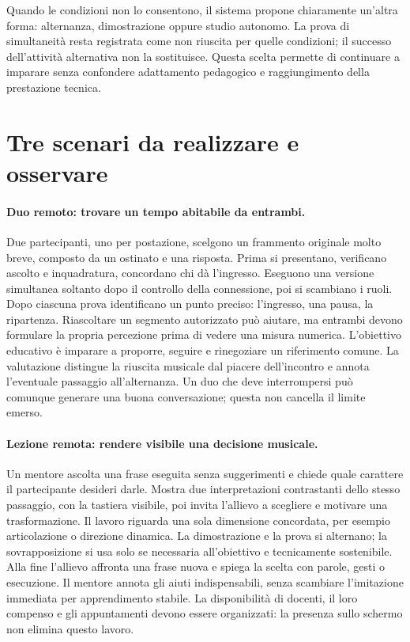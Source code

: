 Quando le condizioni non lo consentono, il sistema propone chiaramente
un'altra forma: alternanza, dimostrazione oppure studio autonomo. La prova
di simultaneità resta registrata come non riuscita per quelle condizioni;
il successo dell'attività alternativa non la sostituisce. Questa scelta
permette di continuare a imparare senza confondere adattamento pedagogico
e raggiungimento della prestazione tecnica.

\section{Tre scenari da realizzare e osservare}

\paragraph{Duo remoto: trovare un tempo abitabile da entrambi.}
Due partecipanti, uno per postazione, scelgono un frammento originale
molto breve, composto da un ostinato e una risposta. Prima si presentano,
verificano ascolto e inquadratura, concordano chi dà l'ingresso. Eseguono
una versione simultanea soltanto dopo il controllo della connessione,
poi si scambiano i ruoli. Dopo ciascuna prova identificano un punto preciso:
l'ingresso, una pausa, la ripartenza. Riascoltare un segmento autorizzato
può aiutare, ma entrambi devono formulare la propria percezione prima
di vedere una misura numerica. L'obiettivo educativo è imparare a proporre,
seguire e rinegoziare un riferimento comune. La valutazione distingue
la riuscita musicale dal piacere dell'incontro e annota l'eventuale passaggio
all'alternanza. Un duo che deve interrompersi può comunque generare una
buona conversazione; questa non cancella il limite emerso.

\paragraph{Lezione remota: rendere visibile una decisione musicale.}
Un mentore ascolta una frase eseguita senza suggerimenti e chiede quale
carattere il partecipante desideri darle. Mostra due interpretazioni
contrastanti dello stesso passaggio, con la tastiera visibile, poi invita
l'allievo a scegliere e motivare una trasformazione. Il lavoro riguarda
una sola dimensione concordata, per esempio articolazione o direzione
dinamica. La dimostrazione e la prova si alternano; la sovrapposizione
si usa solo se necessaria all'obiettivo e tecnicamente sostenibile. Alla
fine l'allievo affronta una frase nuova e spiega la scelta con parole,
gesti o esecuzione. Il mentore annota gli aiuti indispensabili, senza
scambiare l'imitazione immediata per apprendimento stabile. La disponibilità
di docenti, il loro compenso e gli appuntamenti devono essere organizzati:
la presenza sullo schermo non elimina questo lavoro.

